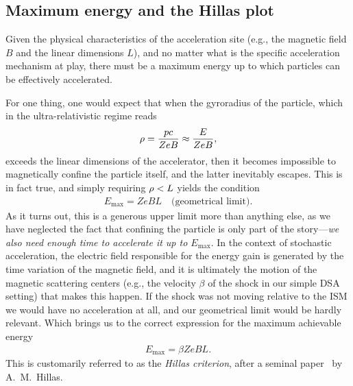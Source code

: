\subsection{Maximum energy and the Hillas plot}

Given the physical characteristics of the acceleration site (e.g., the magnetic
field $B$ and the linear dimensions $L$), and no matter what is the specific acceleration
mechanism at play, there must be a maximum energy up to which particles can be
effectively accelerated.

For one thing, one would expect that when the gyroradius of the particle, which in
the ultra-relativistic regime reads
\begin{align*}
  \rho = \frac{pc}{ZeB} \approx \frac{E}{ZeB},
\end{align*}
exceeds the linear dimensions of the accelerator, then it becomes impossible to
magnetically confine the particle itself, and the latter inevitably escapes. This is in
fact true, and simply requiring $\rho < L$ yields the condition
\begin{align*}
  E_\text{max} = ZeBL \quad\text{(geometrical limit)}.
\end{align*}
As it turns out, this is a generous upper limit more than anything else, as we have
neglected the fact that confining the particle is only part of the story---\emph{we also
need enough time to accelerate it up to $E_\text{max}$}.
In the context of stochastic acceleration, the electric field responsible for the
energy gain is generated by the time variation of the magnetic field, and it is ultimately
the motion of the magnetic scattering centers (e.g., the velocity $\beta$ of the
shock in our simple DSA setting) that makes this happen. If the shock
was not moving relative to the ISM we would have no acceleration at all,
and our geometrical limit would be hardly relevant. Which brings us to the correct
expression for the maximum achievable energy
\begin{align}\label{eq:hillas_emax}
  E_\text{max} = \beta ZeBL.
\end{align}
This is customarily referred to as the \emph{Hillas criterion}, after a seminal
paper~\cite{1984ARA&A..22..425H} by A.~M.~Hillas.

